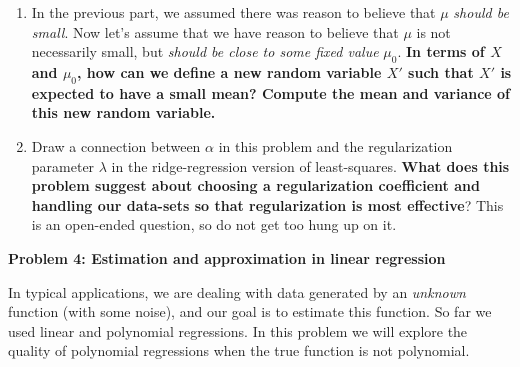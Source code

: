\documentclass{article}\usepackage[utf8]{inputenc}\usepackage[margin=0.4cm,top=0.4cm,bottom=0.4cm]{geometry}\usepackage[usenames,dvipsnames,svgnames,table]{xcolor}
\begin{document}
\begin{enumerate}
\EndSolution
\item In the previous part, we assumed there was reason to believe that $\mu$ \emph{should be small}. Now let's assume that we have reason to believe that $\mu$ is not necessarily small, but \emph{should be close to some fixed value} $\mu_0$. \textbf{In terms of $X$ and $\mu_0$, how can we define a new random variable $X'$ such that $X'$ is expected to have a small mean? Compute the mean and variance of this new random variable.}
\BeginSolution

\EndSolution
\item Draw a connection between $\alpha$ in this problem and the regularization parameter $\lambda$ in the ridge-regression version of least-squares. \textbf{What does this problem suggest about choosing a regularization coefficient and handling our data-sets so that regularization is most effective}? This is an open-ended question, so do not get too hung up on it.
\BeginSolution

\EndSolution
\end{enumerate}
\clearpage

\vspace{-2mm}\noindent\begin{mybox}{\begin{center}\textbf{\color{black}Problem 4: Estimation and approximation in linear regression}\end{center}}\end{mybox}\vspace{-2mm}
\vspace{10pt}
\noindent In typical applications, we are dealing with data generated by an \emph{unknown} function (with some noise), and our goal is to estimate this function. So far we used linear and polynomial regressions. In this problem we will explore the quality of polynomial regressions when the true function is not polynomial.
\vspace{4pt}
\end{document}
